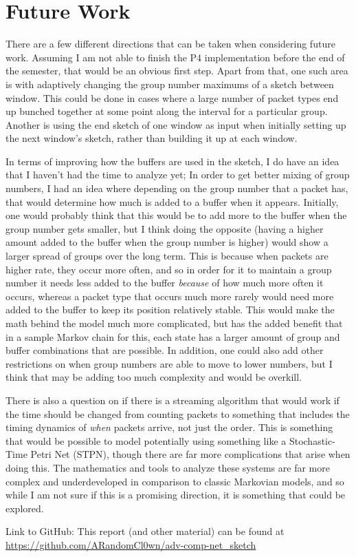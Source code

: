 \documentclass[conference]{IEEEtran}
\begin{document}
\section{Future Work}
There are a few different directions that can be taken when considering future work.  Assuming I am not able to finish the P4 implementation before the end of the semester, that would be an obvious first step.  Apart from that, one such area is with adaptively changing the group number maximums of a sketch between window.  This could be done in cases where a large number of packet types end up bunched together at some point along the interval for a particular group.  Another is using the end sketch of one window as input when initially setting up the next window's sketch, rather than building it up at each window.

In terms of improving how the buffers are used in the sketch, I do have an idea that I haven't had the time to analyze yet;  In order to get better mixing of group numbers, I had an idea where depending on the group number that a packet has, that would determine how much is added to a buffer when it appears.  Initially, one would probably think that this would be to add more to the buffer when the group number gets smaller, but I think doing the opposite (having a higher amount added to the buffer when the group number is higher) would show a larger spread of groups over the long term.  This is because when packets are higher rate, they occur more often, and so in order for it to maintain a group number it needs less added to the buffer \textit{because} of how much more often it occurs, whereas a packet type that occurs much more rarely would need more added to the buffer to keep its position relatively stable.  This would make the math behind the model much more complicated, but has the added benefit that in a sample Markov chain for this, each state has a larger amount of group and buffer combinations that are possible.  In addition, one could also add other restrictions on when group numbers are able to move to lower numbers, but I think that may be adding too much complexity and would be overkill.

There is also a question on if there is a streaming algorithm that would work if the time should be changed from counting packets to something that includes the timing dynamics of \textit{when} packets arrive, not just the order.  This is something that would be possible to model potentially using something like a Stochastic-Time Petri Net (STPN), though there are far more complications that arise when doing this.  The mathematics and tools to analyze these systems\cite{HORVATH2012315}\cite{oris} are far more complex and underdeveloped in comparison to classic Markovian models, and so while I am not sure if this is a promising direction, it is something that could be explored.




Link to GitHub:  This report (and other material) can be found at \url{https://github.com/ARandomCl0wn/adv-comp-net_sketch}
\end{document}
